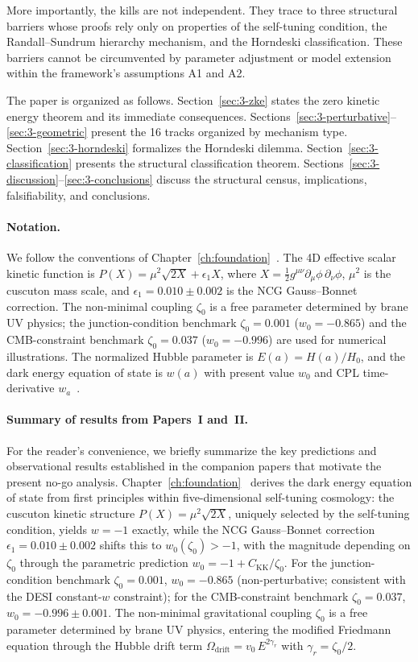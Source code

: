 More importantly, the kills are not independent. They trace to three structural barriers whose proofs rely only on properties of the self-tuning condition, the Randall--Sundrum hierarchy mechanism, and the Horndeski classification. These barriers cannot be circumvented by parameter adjustment or model extension within the framework's assumptions A1 and A2.

The paper is organized as follows. Section~\ref{sec:3-zke} states the zero kinetic energy theorem and its immediate consequences. Sections~\ref{sec:3-perturbative}--\ref{sec:3-geometric} present the 16 tracks organized by mechanism type. Section~\ref{sec:3-horndeski} formalizes the Horndeski dilemma. Section~\ref{sec:3-classification} presents the structural classification theorem. Sections~\ref{sec:3-discussion}--\ref{sec:3-conclusions} discuss the structural census, implications, falsifiability, and conclusions.

\paragraph{Notation.}
We follow the conventions of Chapter~\ref{ch:foundation}~\cite{ch3:paper1}. The 4D effective scalar kinetic function is $P(X) = \mu^2\sqrt{2X} + \epsilon_1 X$, where $X = \tfrac{1}{2}g^{\mu\nu}\partial_\mu\phi\,\partial_\nu\phi$, $\mu^2$ is the cuscuton mass scale, and $\epsilon_1 = 0.010 \pm 0.002$ is the NCG Gauss--Bonnet correction. The non-minimal coupling $\zeta_0$ is a free parameter determined by brane UV physics; the junction-condition benchmark $\zeta_0 = 0.001$ ($w_0 = -0.865$) and the CMB-constraint benchmark $\zeta_0 = 0.037$ ($w_0 = -0.996$) are used for numerical illustrations. The normalized Hubble parameter is $E(a) = H(a)/H_0$, and the dark energy equation of state is $w(a)$ with present value $w_0$ and CPL time-derivative $w_a$~\cite{ch3:chevallier2001,ch3:linder2003}.

\paragraph{Summary of results from Papers~I and~II.}
For the reader's convenience, we briefly summarize the key predictions and observational results established in the companion papers that motivate the present no-go analysis. Chapter~\ref{ch:foundation}~\cite{ch3:paper1} derives the dark energy equation of state from first principles within five-dimensional self-tuning cosmology: the cuscuton kinetic structure $P(X) = \mu^2\sqrt{2X}$, uniquely selected by the self-tuning condition, yields $w = -1$ exactly, while the NCG Gauss--Bonnet correction $\epsilon_1 = 0.010 \pm 0.002$ shifts this to $w_0(\zeta_0) > -1$, with the magnitude depending on $\zeta_0$ through the parametric prediction $w_0 = -1 + C_\mathrm{KK}/\zeta_0$. For the junction-condition benchmark $\zeta_0 = 0.001$, $w_0 = -0.865$ (non-perturbative; consistent with the DESI constant-$w$ constraint); for the CMB-constraint benchmark $\zeta_0 = 0.037$, $w_0 = -0.996 \pm 0.001$. The non-minimal gravitational coupling $\zeta_0$ is a free parameter determined by brane UV physics, entering the modified Friedmann equation through the Hubble drift term $\Omega_{\mathrm{drift}} = v_0\,E^{2\gamma_r}$ with $\gamma_r = \zeta_0/2$.

